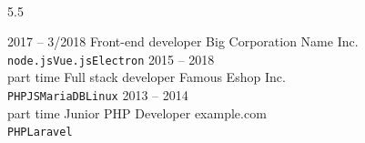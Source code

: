 \documentclass[9pt]{developercv} %
\begin{document}
\vspace{0.5cm} %



\begin{minipage}[t]{0.4\textwidth} %
	\vspace{-\baselineskip} %
	
	\lorem \lorem \lorem \lorem \lorem\\ %
\end{minipage}
\hfill %
\begin{minipage}[t]{0.5\textwidth} %
	\vspace{-\baselineskip} %
	
	\begin{barchart}{5.5} %
	\end{barchart}
\end{minipage}

\begin{center}
\end{center}



\begin{entrylist}
	\entry
		{2017 -- 3/2018}
		{Front-end developer}
		{Big Corporation Name Inc.}
		{\lorem \lorem \lorem\\ \texttt{node.js}\slashsep\texttt{Vue.js}\slashsep\texttt{Electron}}
	\entry
		{2015 -- 2018\\\footnotesize{part time}}
		{Full stack developer}
		{Famous Eshop Inc.}
		{\lorem\lorem\\ \texttt{PHP}\slashsep\texttt{JS}\slashsep\texttt{MariaDB}\slashsep\texttt{Linux}}
	\entry
		{2013 -- 2014\\\footnotesize{part time}}
		{Junior PHP Developer}
		{example.com}
		{\lorem\lorem\\ \texttt{PHP}\slashsep\texttt{Laravel}}
\end{entrylist}
\end{document}
